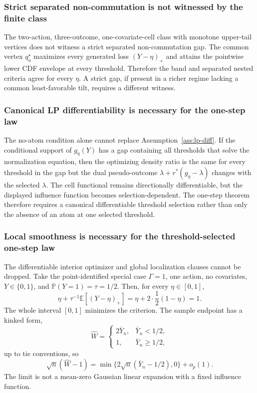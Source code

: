 \documentclass[11pt]{article}
\newcommand{\E}{\mathbb{E}}
\renewcommand{\Pr}{\mathbb{P}}
\theoremstyle{definition}
\theoremstyle{plain}
\theoremstyle{remark}
\begin{document}
\subsubsection*{Strict separated non-commutation is not witnessed by the finite class}
The two-action, three-outcome, one-covariate-cell class with monotone
upper-tail vertices does not witness a strict separated non-commutation gap.
The common vertex \(q_a^\star\) maximizes every generated loss
\((Y-\eta)_+\) and attains the pointwise lower CDF envelope at every threshold.
Therefore the band and separated nested criteria agree for every \(\eta\).
A strict gap, if present in a richer regime lacking a common least-favorable
tilt, requires a different witness.

\subsubsection*{Canonical LP differentiability is necessary for the one-step law}
The no-atom condition alone cannot replace Assumption~\ref{ass:lp-diff}.  If the
conditional support of \(g_\eta(Y)\) has a gap containing all thresholds that
solve the normalization equation, then the optimizing density ratio is the same
for every threshold in the gap but the dual pseudo-outcome
\(\lambda+r^*(g_\eta-\lambda)\) changes with the selected \(\lambda\).  The
cell functional remains directionally differentiable, but the displayed
influence function becomes selection-dependent.  The one-step theorem therefore
requires a canonical differentiable threshold selection rather than only the
absence of an atom at one selected threshold.

\subsubsection*{Local smoothness is necessary for the threshold-selected one-step law}
The differentiable interior optimizer and global localization clauses cannot be
dropped.  Take the point-identified special case \(\Gamma=1\), one action, no
covariates, \(Y\in\{0,1\}\), and \(\Pr(Y=1)=\tau=1/2\).  Then, for every
\(\eta\in[0,1]\),
\[
\eta+\tau^{-1}\E[(Y-\eta)_+]
=
\eta+2\cdot \frac12(1-\eta)=1.
\]
The whole interval \([0,1]\) minimizes the criterion.  The sample endpoint has a
kinked form,
\[
\widehat W=
\begin{cases}
2\bar Y_n, & \bar Y_n<1/2,\\
1, & \bar Y_n\ge 1/2,
\end{cases}
\]
up to tie conventions, so
\[
\sqrt n(\widehat W-1)
=
\min\{2\sqrt n(\bar Y_n-1/2),0\}+o_p(1).
\]
The limit is not a mean-zero Gaussian linear expansion with a fixed influence
function.
\end{document}
